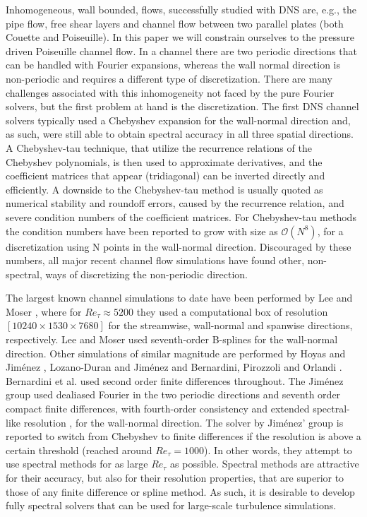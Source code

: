 \documentclass[preprint]{elsarticle}
\begin{document}
Inhomogeneous, wall bounded, flows, successfully studied with DNS are, e.g., the pipe flow, free shear layers and channel flow between two parallel plates (both Couette and Poiseuille). In this paper we will constrain ourselves to the pressure driven Poiseuille channel flow. In a channel there are two periodic directions that can be handled with Fourier expansions, whereas the wall normal direction is non-periodic and requires a different type of discretization. There are many challenges associated with this inhomogeneity not faced by the pure Fourier solvers, but the first problem at hand is the discretization. The first DNS channel solvers typically used a Chebyshev expansion for the wall-normal direction and, as such, were still able to obtain spectral accuracy in all three spatial directions. A Chebyshev-tau technique, that utilize the recurrence relations of the Chebyshev polynomials, is then used to approximate derivatives, and the coefficient matrices that appear (tridiagonal) can be inverted directly and efficiently. A downside to the Chebyshev-tau method is usually quoted \cite{canuto1988} as numerical stability and roundoff errors, caused by the recurrence relation, and severe condition numbers of the coefficient matrices. For Chebyshev-tau methods the condition numbers have been reported to grow with size as $\mathcal{O}(N^8)$, for a discretization using N points in the wall-normal direction. Discouraged by these numbers, all major recent channel flow simulations have found other, non-spectral, ways of discretizing the non-periodic direction. 


The largest known channel simulations to date have been performed by Lee and Moser \cite{leemoser15}, where for $Re_{\tau}\approx 5200$ they used a computational box of resolution $[10240 \times 1530 \times 7680]$ for the streamwise, wall-normal and spanwise directions, respectively. Lee and Moser used seventh-order B-splines for the wall-normal direction. Other simulations of similar magnitude are performed by Hoyas and Jim\'{e}nez \cite{hoyas06, hoyas08}, Lozano-Duran and Jim\'{e}nez \cite{Lozano2014} and Bernardini, Pirozzoli and Orlandi \cite{bernardini2014}. Bernardini et al. used second order finite differences throughout. The Jim\'{e}nez group used dealiased Fourier in the two periodic directions and seventh order compact finite differences, with fourth-order consistency and extended spectral-like resolution \cite{Lele92}, for the wall-normal direction. The solver by Jim\'{e}nez' group is reported to switch from Chebyshev to finite differences if the resolution is above a certain threshold \cite{hoyas08} (reached around $Re_{\tau}=1000$). In other words, they attempt to use spectral methods for as large $Re_{\tau}$ as possible. Spectral methods are attractive for their accuracy, but also for their resolution properties, that are superior to those of any finite difference or spline method. As such, it is desirable to develop fully spectral solvers that can be used for large-scale turbulence simulations.
\end{document}
